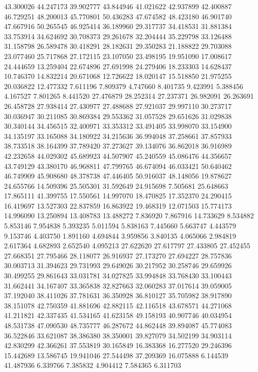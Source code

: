 43.300026
44.247173
39.902777
43.844946
41.021622
42.937899
42.400887
46.729251
48.200013
45.770801
50.436283
47.674582
48.423180
46.901740
47.667916
50.265545
46.925414
36.189960
29.317737
34.418531
31.881384
33.753914
34.624692
30.708373
29.261678
32.204444
35.229798
33.126488
31.158798
26.589478
30.418291
28.182631
29.350283
21.188822
29.703088
23.077460
25.717868
27.172115
23.107050
23.498195
19.951090
17.008617
24.444659
13.259404
22.674896
27.691998
24.279406
18.233303
14.628437
10.746370
14.832214
20.671068
12.726622
18.020147
15.518850
21.975255
20.036822
12.477332
7.611196
7.809379
4.747660
8.401735
9.423991
5.388456
4.167527
7.801265
8.441520
27.476879
28.252314
27.237371
26.982091
26.263691
26.458728
27.938414
27.430977
27.488688
27.921037
29.997110
30.273717
30.036947
30.211085
30.869384
29.553362
31.057528
29.651626
31.029838
30.340144
34.456515
32.400971
33.353312
33.491405
33.998070
33.154900
34.135197
33.165088
34.180922
34.215636
36.994048
37.258661
37.857933
38.733518
38.164399
37.789420
37.273627
39.134076
36.862018
36.916989
42.232658
44.029302
45.689923
44.507907
45.240559
45.086476
44.356657
43.749129
43.380170
46.968811
47.799765
46.674094
46.033421
50.640462
46.749909
45.908680
48.378738
47.446405
50.916037
48.148056
19.878627
24.655766
14.509396
25.505301
31.592649
24.915698
7.505681
25.648663
17.865111
41.399755
17.550561
14.997070
18.470825
17.352370
24.290415
16.419697
13.527303
22.837859
16.863922
19.468319
12.071503
15.774173
14.996090
13.250894
13.408783
13.488272
7.836920
7.867916
14.733629
8.534882
5.853146
7.954838
5.393235
5.011594
5.838163
7.445660
5.663747
4.443579
9.153746
4.403750
1.891160
4.694844
3.959856
3.840135
4.065066
2.984819
2.617364
4.682893
2.652540
4.095213
27.622620
27.617797
27.433805
27.452455
27.668351
27.795466
28.118077
26.916937
27.173270
27.694227
28.757836
30.003713
31.394623
29.731993
29.649026
30.217952
30.258746
29.659926
30.499255
29.861643
33.031781
34.027825
33.994848
33.768430
33.100443
31.662441
34.167407
33.365838
32.827663
32.060283
37.017614
39.059005
37.192040
38.411026
37.781631
36.350928
36.810127
35.705982
38.917890
38.151078
42.750359
41.881696
42.882115
42.116518
43.678571
44.271068
41.211821
42.337435
41.534165
41.623158
49.158193
40.907746
40.034954
48.531738
47.090530
48.735777
46.287672
44.862448
39.894087
45.774083
36.522846
33.621087
38.386380
38.350001
39.827079
34.502199
34.903114
42.830299
42.366261
37.553819
30.165849
16.383368
16.277520
29.246396
15.442689
13.586745
19.941046
27.544498
37.209369
16.075888
6.144539
41.487936
6.339766
7.385832
4.904412
7.584365
6.311703
